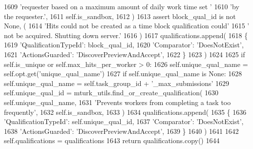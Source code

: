 \begin{DoxyCode}
1609                 \textcolor{stringliteral}{'requester based on a maximum amount of daily work time set '}
1610                 \textcolor{stringliteral}{'by the requester.'},
1611                 self.is\_sandbox,
1612             )
1613             \textcolor{keyword}{assert} block\_qual\_id \textcolor{keywordflow}{is} \textcolor{keywordflow}{not} \textcolor{keywordtype}{None}, (
1614                 \textcolor{stringliteral}{'Hits could not be created as a time block qualification could'}
1615                 \textcolor{stringliteral}{' not be acquired. Shutting down server.'}
1616             )
1617             qualifications.append(
1618                 \{
1619                     \textcolor{stringliteral}{'QualificationTypeId'}: block\_qual\_id,
1620                     \textcolor{stringliteral}{'Comparator'}: \textcolor{stringliteral}{'DoesNotExist'},
1621                     \textcolor{stringliteral}{'ActionsGuarded'}: \textcolor{stringliteral}{'DiscoverPreviewAndAccept'},
1622                 \}
1623             )
1624 
1625         \textcolor{keywordflow}{if} self.is\_unique \textcolor{keywordflow}{or} self.max\_hits\_per\_worker > 0:
1626             self.unique\_qual\_name = self.opt.get(\textcolor{stringliteral}{'unique\_qual\_name'})
1627             \textcolor{keywordflow}{if} self.unique\_qual\_name \textcolor{keywordflow}{is} \textcolor{keywordtype}{None}:
1628                 self.unique\_qual\_name = self.task\_group\_id + \textcolor{stringliteral}{'\_max\_submissions'}
1629             self.unique\_qual\_id = mturk\_utils.find\_or\_create\_qualification(
1630                 self.unique\_qual\_name,
1631                 \textcolor{stringliteral}{'Prevents workers from completing a task too frequently'},
1632                 self.is\_sandbox,
1633             )
1634             qualifications.append(
1635                 \{
1636                     \textcolor{stringliteral}{'QualificationTypeId'}: self.unique\_qual\_id,
1637                     \textcolor{stringliteral}{'Comparator'}: \textcolor{stringliteral}{'DoesNotExist'},
1638                     \textcolor{stringliteral}{'ActionsGuarded'}: \textcolor{stringliteral}{'DiscoverPreviewAndAccept'},
1639                 \}
1640             )
1641 
1642         self.qualifications = qualifications
1643         \textcolor{keywordflow}{return} qualifications.copy()
1644 
\end{DoxyCode}
\mbox{\label{classparlai_1_1mturk_1_1core_1_1mturk__manager_1_1MTurkManager_a6df9024b28007db08c481a218e6b4fca}} 
